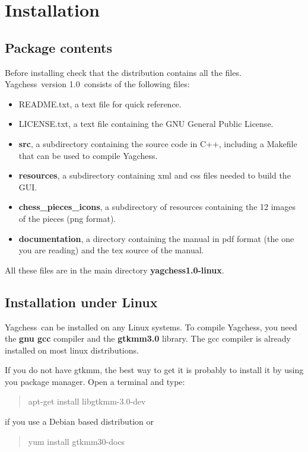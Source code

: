 \documentclass[a4paper]{article}
\newcommand{\nameprog}{Yagchess}
\newcommand{\version}{1.0}
\begin{document}
\section{Installation}
\label{install}
\subsection{Package contents}
Before installing check that the distribution contains all the files.
\nameprog\ version \version\ consists of the following files:

\begin{itemize}
\item README.txt, a text file for quick reference.
\item LICENSE.txt, a text file containing the GNU General Public License.
\item \textbf{src}, a subdirectory containing the source code in C++, including a Makefile that can be used to compile \nameprog.
\item \textbf{resources}, a subdirectory containing xml and css files needed to build the GUI.
\item \textbf{chess\_pieces\_icons}, a subdirectory of resources containing the 12 images of the pieces (png format).
\item \textbf{documentation}, a directory containing the manual in pdf format (the one you are reading) and the tex source of the manual.
\end{itemize}

All these files are in the main directory \textbf{yagchess1.0-linux}.


\subsection{Installation under Linux}
\nameprog\ can be installed on any Linux systems. To compile \nameprog, you need the \textbf{gnu gcc} compiler and the \textbf{gtkmm3.0} library.
The gcc compiler is already installed on most linux distributions.

If you do not have gtkmm, the best way to get it is probably to install it by using you package manager.
Open a terminal and type:

\begin{quote}
apt-get install libgtkmm-3.0-dev
\end{quote}

if you use a Debian based distribution or

\begin{quote}
yum install gtkmm30-docs
\end{quote}
\end{document}
